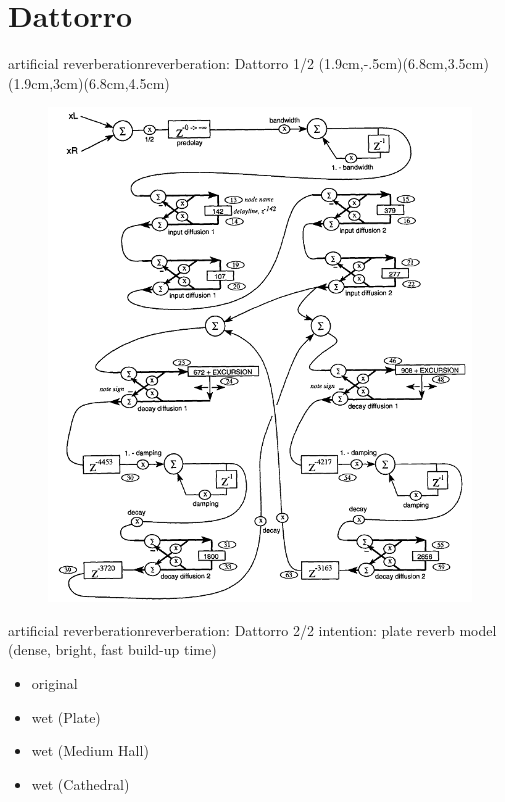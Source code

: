 \section{Dattorro}
\begin{frame}{artificial reverberation}{reverberation: Dattorro 1/2}
	\vspace{-6mm}
    (1.9cm,-.5cm)(6.8cm,3.5cm)
    (1.9cm,3cm)(6.8cm,4.5cm)
    \begin{figure}
		\centerline{\includegraphics[scale=.37]{graph/dattorro}}
	\end{figure} 
\end{frame}

\begin{frame}{artificial reverberation}{reverberation: Dattorro 2/2}
	intention: plate reverb model \pause (dense, bright, fast build-up time)
    \bigskip
    \begin{itemize}
        \item   original 
        \item   wet (Plate) 
        \item   wet (Medium Hall) 
        \item   wet (Cathedral) 
    \end{itemize}
\end{frame}

